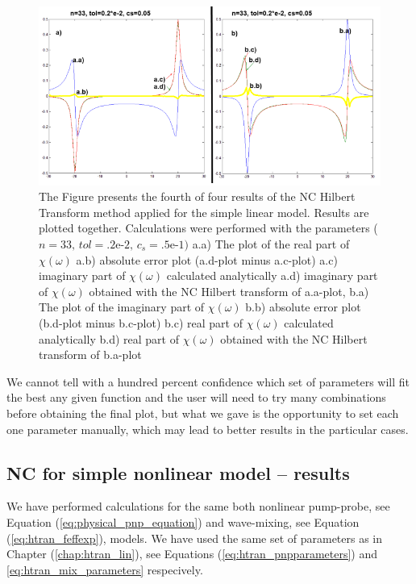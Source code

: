 \documentclass[12pt,twoside,a4paper]{article}
\numberwithin{equation}{subsection}
\numberwithin{figure}{subsection}
\begin{document}
\begin{figure}
  \includegraphics[width=150mm]{img/nc_lin4.png}
  \caption{The Figure presents the fourth of four results of the NC Hilbert Transform method applied for the simple linear model. Results are plotted together. Calculations were performed with the parameters ($n = 33, \, tol = \mbox{.2e-2}, \, c_s = \mbox{.5e-1}) $
    a.a) The plot of the real part of $\chi (\omega )$
    a.b) absolute error plot (a.d-plot minus a.c-plot) 
    a.c) imaginary part of $\chi (\omega )$ calculated analytically 
    a.d) imaginary part of $\chi (\omega )$ obtained with the NC Hilbert transform of a.a-plot,
    b.a) The plot of the imaginary part of $\chi (\omega )$
    b.b) absolute error plot (b.d-plot minus b.c-plot) 
    b.c) real part of $\chi (\omega )$ calculated analytically 
    b.d) real part of $\chi (\omega )$ obtained with the NC Hilbert transform of b.a-plot
    \label{fig:nc_lin4} 
    }
\end{figure}

We cannot tell with a hundred percent confidence which set of parameters will fit the best any given function and the user will need to try many combinations before obtaining the final plot, but what we gave is the opportunity to set each one parameter manually, which may lead to better results in the particular cases.

\subsection{NC for simple nonlinear model -- results} \label{chap:nc_nlo}

We have performed calculations for the same both nonlinear pump-probe, see Equation (\ref{eq:physical_pnp_equation}) and wave-mixing, see Equation (\ref{eq:htran_feffexp}), models. We have used the same set of parameters as in Chapter (\ref{chap:htran_lin}), see Equations (\ref{eq:htran_pnpparameters}) and \ref{eq:htran_mix_parameters} respecively.
\end{document}
